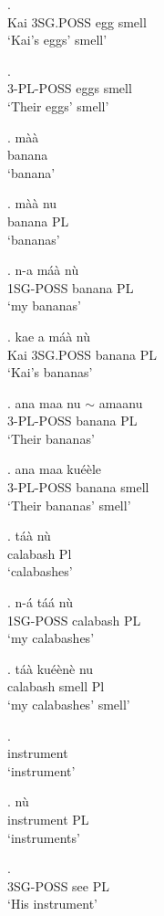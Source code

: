 \documentclass{assets/fieldnotes}
\begin{document}
\exg. \\
Kai 3SG.POSS egg smell\\
`Kai's eggs' smell'

\exg. \\
3-PL-POSS eggs smell\\
`Their eggs' smell' 

\exg. màà \\
banana\\
`banana'

\exg. màà nu \\
banana PL\\
`bananas'

\exg. n-a máà nù \\
1SG-POSS banana PL\\
`my bananas'

\exg. kae a máà nù \\
Kai 3SG.POSS banana PL\\
`Kai's bananas'

\exg. ana maa nu $\sim$ amaanu \\
3-PL-POSS banana PL\\
`Their bananas'


\exg. ana maa ku\textipa{\textltailn}éèle \\
3-PL-POSS banana smell\\
`Their bananas' smell'

\exg. táà nù \\
calabash Pl\\
`calabashes' 

\exg. n-á táá nù \\
1SG-POSS calabash PL\\
`my calabashes'

\exg. táà ku\textipa{\textltailn}éènè nu \\
calabash smell Pl\\
`my calabashes' smell'

\exg.  \\
instrument\\
`instrument'

\exg.  nù \\
instrument PL\\
`instruments'

\exg.  \\
3SG-POSS see PL\\
`His instrument'
\end{document}
